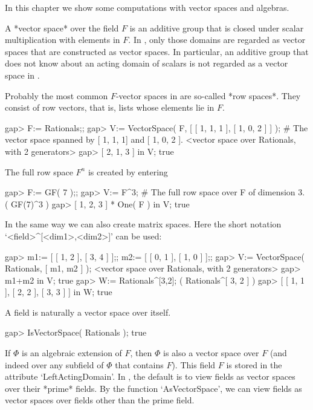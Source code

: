 
In this chapter we show some computations with vector spaces and
algebras.


A *vector space* over the field $F$ is an additive group that is closed
under scalar multiplication with elements in $F$.
In {\GAP}, only those domains are regarded as vector spaces that are
constructed as vector spaces.
In particular, an additive group that does not know about an
acting domain of scalars is not regarded as a vector space in {\GAP}.

Probably the most common $F$-vector spaces in {\GAP} are so-called
*row spaces*.
They consist of row vectors, that is, lists whose elements lie in $F$.

\beginexample
gap> F:= Rationals;;
gap> V:= VectorSpace( F, [ [ 1, 1, 1 ], [ 1, 0, 2 ] ] );
# The vector space spanned by [ 1, 1, 1] and [ 1, 0, 2 ].
<vector space over Rationals, with 2 generators>
gap> [ 2, 1, 3 ] in V;
true
\endexample

The full row space $F^n$ is created by entering

\beginexample
gap> F:= GF( 7 );;
gap> V:= F^3;                                           
# The full row space over F of dimension 3. 
( GF(7)^3 )
gap> [ 1, 2, 3 ] * One( F ) in V;  
true
\endexample

In the same way we can also create matrix spaces. Here the short notation
`<field>^[<dim1>,<dim2>]' can be used:

\beginexample
gap> m1:= [ [ 1, 2 ], [ 3, 4 ] ];; m2:= [ [ 0, 1 ], [ 1, 0 ] ];;
gap> V:= VectorSpace( Rationals, [ m1, m2 ] );
<vector space over Rationals, with 2 generators>
gap> m1+m2 in V;
true
gap> W:= Rationals^[3,2];
( Rationals^[ 3, 2 ] )
gap> [ [ 1, 1 ], [ 2, 2 ], [ 3, 3 ] ] in W;
true
\endexample

A field is naturally a vector space over itself. 

\beginexample
gap> IsVectorSpace( Rationals );
true
\endexample

If $\Phi$ is an algebraic extension of $F$, then $\Phi$ is
also a vector space over $F$ (and indeed over any subfield of $\Phi$
that contains $F$). This field $F$ is stored in the attribute
`LeftActingDomain'.
In {\GAP}, the default is to view fields as vector spaces
over their *prime* fields.
By the function `AsVectorSpace', we can view fields
as vector spaces over fields other than the prime field.

